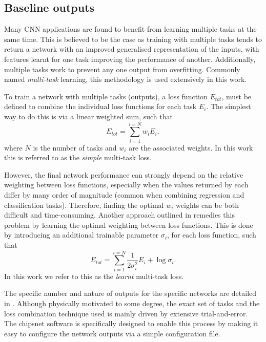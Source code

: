 \subsection{Baseline outputs} %
\label{sec:cnn_baseline_outputs} %

Many CNN applications are found to benefit from learning multiple tasks at the same time. This is
believed to be the case as training with multiple tasks tends to return a network with an improved
generalised representation of the inputs, with features learnt for one task improving the
performance of another. Additionally, multiple tasks work to prevent any one output from
overfitting. Commonly named \emph{multi-task} learning, this methodology is used extensively in
this work.

To train a network with multiple tasks (outputs), a loss function $E_{tot}$, must be defined to
combine the individual loss functions for each task $E_{i}$. The simplest way to do this is via a
linear weighted sum, such that
\begin{equation}
    E_{tot} = \sum_{i=1}^{i=N}w_{i}E_{i},
    \label{eq:multi_simple}
\end{equation}
where $N$ is the number of tasks and $w_{i}$ are the associated weights. In this work this is
referred to as the \emph{simple} multi-task loss.

However, the final network performance can strongly depend on the relative weighting between loss
functions, especially when the values returned by each differ by many order of magnitude (common
when combining regression and classification tasks). Therefore, finding the optimal $w_{i}$
weights can be both difficult and time-consuming. Another approach outlined in
 remedies this problem by learning the optimal weighting between loss
functions. This is done by introducing an additional trainable parameter $\sigma_{i}$, for each
loss function, such that
\begin{equation}
    E_{tot}= \sum_{i=1}^{i=N}\frac{1}{2\sigma_{i}^2}E_{i}+ \log\sigma_{i}.
    \label{eq:multi_learnt}
\end{equation}
In this work we refer to this as the \emph{learnt} multi-task loss.

The specific number and nature of outputs for the specific networks are detailed in
. Although physically motivated to some degree, the exact set of
tasks and the loss combination technique used is mainly driven by extensive trial-and-error. The
chipsnet software is specifically designed to enable this process by making it easy to configure
the network outputs via a simple configuration file.

